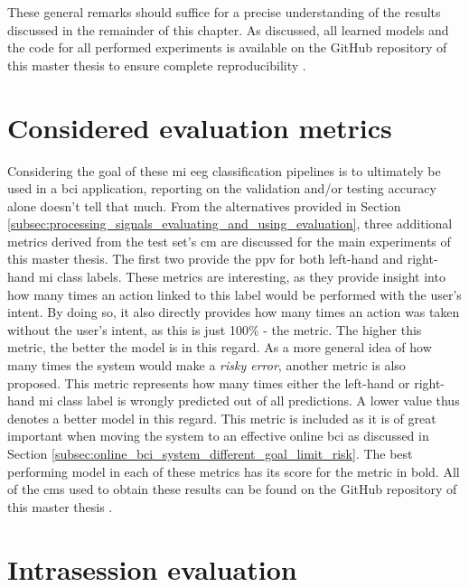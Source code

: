 These general remarks should suffice for a precise understanding of the results discussed in the remainder of this chapter.
As discussed, all learned models and the code for all performed experiments is available on the GitHub repository of this master thesis to ensure complete reproducibility \citep{github_project}.

\section{Considered evaluation metrics}
\label{sec:evaluation_eval_metrics}

Considering the goal of these \gls{mi} \gls{eeg} classification pipelines is to ultimately be used in a \gls{bci} application, reporting on the validation and/or testing accuracy alone doesn't tell that much.
From the alternatives provided in Section \ref{subsec:processing_signals_evaluating_and_using_evaluation}, three additional metrics derived from the test set's \gls{cm} are discussed for the main experiments of this master thesis.
The first two provide the \gls{ppv} for both left-hand and right-hand \gls{mi} class labels.
These metrics are interesting, as they provide insight into how many times an action linked to this label would be performed with the user's intent.
By doing so, it also directly provides how many times an action was taken without the user's intent, as this is just 100\% - the metric.
The higher this metric, the better the model is in this regard.
As a more general idea of how many times the system would make a \textit{risky error}, another metric is also proposed.
This metric represents how many times either the left-hand or right-hand \gls{mi} class label is wrongly predicted out of all predictions.
A lower value thus denotes a better model in this regard.
This metric is included as it is of great important when moving the system to an effective online \gls{bci} as discussed in Section \ref{subsec:online_bci_system_different_goal_limit_risk}.
The best performing model in each of these metrics has its score for the metric in bold.
All of the \glspl{cm} used to obtain these results can be found on the GitHub repository of this master thesis \citep{github_project}.


\section{Intrasession evaluation}
\label{sec:evaluation_intrasession}


